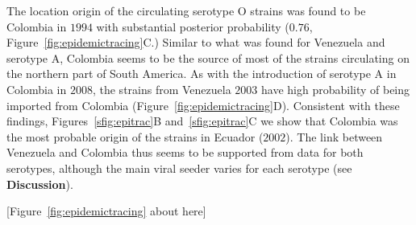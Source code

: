 \documentclass[10pt]{article}
\begin{document}
The location origin of the circulating serotype O strains was found to be Colombia in $1994$ with substantial posterior probability ($0.76$, Figure~\ref{fig:epidemictracing}C.)
Similar to what was found for Venezuela and serotype A, Colombia seems to be the source of most of the strains circulating on the northern part of South America.
As with the introduction of serotype A in Colombia in $2008$, the strains from Venezuela $2003$ have high probability of being imported from Colombia (Figure~\ref{fig:epidemictracing}D).
Consistent with these findings, Figures~\ref{sfig:epitrac}B and~\ref{sfig:epitrac}C we show that Colombia was the most probable origin of the strains in Ecuador ($2002$).
The link between Venezuela and Colombia thus seems to be supported from data for both serotypes, although the main viral seeder varies for each serotype (see \textbf{Discussion}).

\begin{center}
 [Figure~\ref{fig:epidemictracing} about here]
\end{center}
\end{document}
